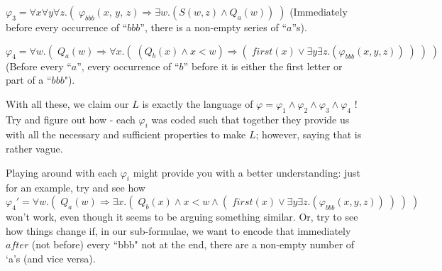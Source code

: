 \documentclass{article}
\begin{document}
\begin{flushleft}
$\varphi_3 = \forall x \forall y \forall z.(\;\varphi_{bbb}(x,\, y,\, z) \Rightarrow \exists w.(S(w, z) \land Q_a(w))\;)$ (Immediately before every occurrence of ``$bbb$'', there is a non-empty series of ``$a$''s).

$\varphi_4 = \forall w.(\; Q_a(w) \Rightarrow \forall x.(\;(Q_b(x) \land x < w) \Rightarrow (\; first(x) \lor \exists y \exists z.(\varphi_{bbb}(x, y, z))\;) \;)\;)$ (Before every ``$a$'', every occurrence of ``$b$'' before it is either the first letter or part of a ``$bbb$").

With all these, we claim our $L$ is exactly the language of $\varphi = \varphi_1 \land \varphi_2 \land \varphi_3 \land \varphi_4$ ! Try and figure out how - each $\varphi_i$ was coded such that together they provide us with all the necessary and sufficient properties to make $L$; however, saying that is rather vague.

Playing around with each $\varphi_i$ might provide you with a better understanding: just for an example, try and see how $\varphi_4' = \forall w.(\; Q_a(w) \Rightarrow \exists x.(\;Q_b(x) \land x < w \land (\; first(x) \lor \exists y \exists z.(\varphi_{bbb}(x, y, z))\;) \;)\;)$ won't work, even though it seems to be arguing something similar. Or, try to see how things change if, in our sub-formulae, we want to encode that immediately $after$ (not before) every ``bbb" not at the end, there are a non-empty number of `a's (and vice versa).
\end{flushleft}
\end{document}
